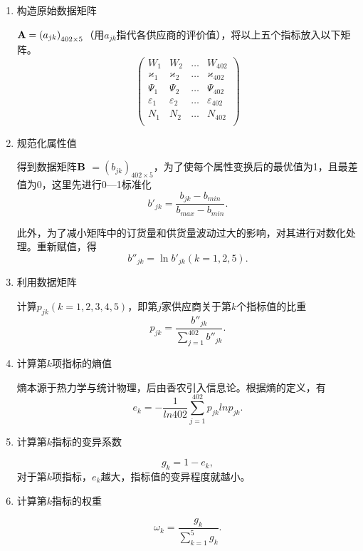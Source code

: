 \begin{enumerate}

\item 构造原始数据矩阵

${\text{\bf A}}={(a_{jk})}_{402 \times 5}$（用$a_{jk}$指代各供应商的评价值），将以上五个指标放入以下矩阵。
\begin{equation}       %
\left(                 %
  \begin{array}{cccc}
    W_1 & W_2 & \dots & W_{402}\\
    \varkappa_1 & \varkappa_2 & \dots & \varkappa_402\\
    \Psi_1 & \Psi_2 & \dots & \Psi_402\\
    \varepsilon_1 & \varepsilon_2 & \dots & \varepsilon_402 \\
    N_1 & N_2 & \dots & N_402 \\
  \end{array}
\right)                 %
\end{equation}

\item 规范化属性值

得到数据矩阵$\bf B$ $ =(b_{jk})_{402 \times 5}$，为了使每个属性变换后的最优值为1，且最差值为0，这里先进行0—1标准化
\begin{equation}
    b'_{jk}=\frac{b_{jk}-b_{min}}{b_{max}-b_{min}}.
\end{equation}

此外，为了减小矩阵中的订货量和供货量波动过大的影响，对其进行对数化处理。重新赋值，得
\begin{equation}
    b''_{jk}=\ln b'_{jk} (k=1,2,5).
\end{equation}

\item 利用数据矩阵

计算$p_{jk}(k=1,2,3,4,5)$，即第$j$家供应商关于第$k$个指标值的比重
\begin{equation}
    p_{jk}=\frac{b''_{jk}}{\sum_{j=1}^{402}b''_{jk}}.
\end{equation}

\item 计算第$k$项指标的熵值

熵本源于热力学与统计物理，后由香农引入信息论。根据熵的定义，有
\begin{equation}
    e_k=-\frac{1}{ln402}\sum_{j=1}^{402}p_{jk}lnp_{jk}.
\end{equation}

\item 计算第$k$指标的变异系数

\begin{equation}
    g_k=1-e_k,
\end{equation}
对于第$k$项指标，$e_k$越大，指标值的变异程度就越小。

\item 计算第$k$指标的权重

\begin{equation}
    \omega_k=\frac{g_k}{\sum_{k=1}^{5}g_k}.
\end{equation}

\end{enumerate}

